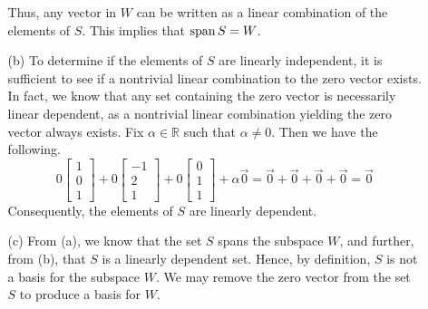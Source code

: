 \begin{SaveQuestion}
\begin{enumerate}
\begin{itemize}
            Thus, any vector in $W$ can be written as a linear combination of the elements of $S$. This implies that $\operatorname{span} S = W$.
            \item[(b)] To determine if the elements of $S$ are linearly independent, it is sufficient to see if a nontrivial linear combination to the zero vector exists. In fact, we know that any set containing the zero vector is necessarily linear dependent, as a nontrivial linear combination yielding the zero vector always exists. Fix $\alpha \in \mathbb{R}$ such that $\alpha \neq 0$. Then we have the following. 
            $$0\begin{bmatrix} 1 \\ 0 \\ 1 \end{bmatrix} + 0\begin{bmatrix} -1 \\ 2 \\ 1 \end{bmatrix} + 0\begin{bmatrix} 0 \\ 1 \\ 1 \end{bmatrix} + \alpha\vec 0 = \vec 0 + \vec 0 + \vec 0 + \vec 0 = \vec 0$$
            Consequently, the elements of $S$ are linearly dependent. 
            \item[(c)] From (a), we know that the set $S$ spans the subspace $W$, and further, from (b), that $S$ is a linearly dependent set. Hence, by definition, $S$ is not a basis for the subspace $W$. We may remove the zero vector from the set $S$ to produce a basis for $W$.   
        \end{itemize}
    \end{enumerate}
\end{SaveQuestion}


